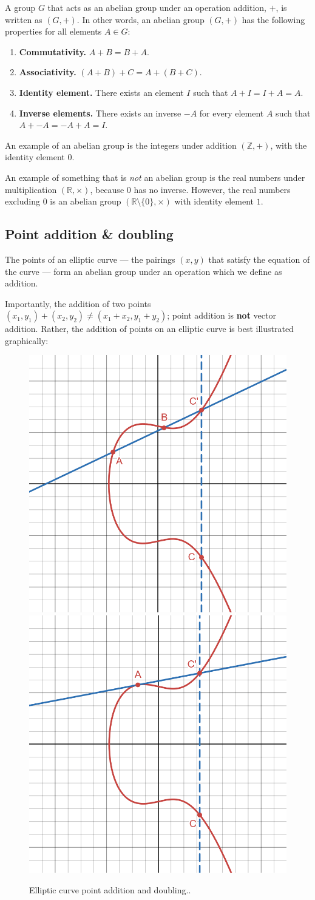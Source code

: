 \documentclass[a4paper]{article}
\begin{document}
A group $G$ that acts as an abelian group under an operation addition, $+$, is written as $(G, +)$. In other words, an abelian group $(G, +)$ has the following properties for all elements $A \in G$:
\begin{enumerate}
    \item \textbf{Commutativity.} $A + B = B + A$.
    \item \textbf{Associativity.} $(A + B) + C = A + (B + C)$.
    \item \textbf{Identity element.} There exists an element $I$ such that $A + I = I + A = A$.
    \item \textbf{Inverse elements.} There exists an inverse $-A$ for every element $A$ such that $A + -A = -A + A = I$.\cite[p. 11]{guide}
\end{enumerate}

An example of an abelian group is the integers under addition $(\mathbb{Z}, +)$, with the identity element $0$. 

An example of something that is \textit{not} an abelian group is the real numbers under multiplication $(\mathbb{R}, \times)$, because $0$ has no inverse. However, the real numbers excluding $0$ is an abelian group $(\mathbb{R} \setminus \{0\}, \times)$ with identity element $1$.

\subsection{Point addition \& doubling}

The points of an elliptic curve --- the pairings $(x,y)$ that satisfy the equation of the curve --- form an abelian group under an operation which we define as addition. 

Importantly, the addition of two points $(x_1, y_1) + (x_2, y_2) \ne (x_1 + x_2, y_1 + y_2)$; point addition is \textbf{not} vector addition. Rather, the addition of points on an elliptic curve is best illustrated graphically:

\begin{figure}[h]
    \centering
    \includegraphics[width=0.3\linewidth]{images/add-add.png}
    \includegraphics[width=0.3\linewidth]{images/add-double.png}
    \caption{Elliptic curve point addition and doubling..}
    \label{fig:add}
\end{figure}
\end{document}

